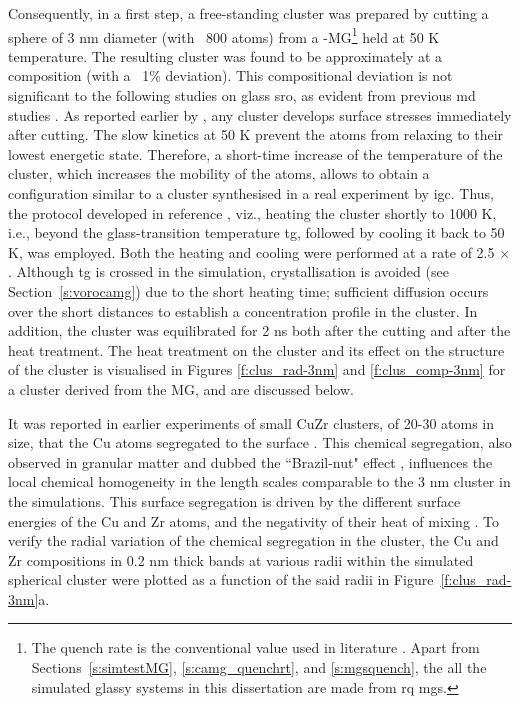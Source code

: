 \begin{changebar}
Consequently, in a first step, a free-standing cluster was prepared by cutting a sphere of 3 nm diameter (with ~800 atoms) from a  \cz-MG\footnote{The  quench rate is the conventional value used in literature \cite{Ritter2011,Adjaoud2016,Adjaoud2018}. Apart from Sections~\ref{s:simtestMG}, \ref{s:camg_quenchrt}, and \ref{s:mgsquench}, the all the simulated glassy systems in this dissertation are made from  \gls{rq} \gls{mg}s.} held at 50 K temperature. The resulting cluster was found to be approximately at a \cz composition (with a ~1\% deviation). This compositional deviation is not significant to the following studies on glass \gls{sro}, as evident from previous \gls{md} studies \cite{Peng2010}. As reported earlier by \textcite{Adjaoud2016}, any cluster develops surface stresses  immediately after cutting. The slow kinetics at 50 K prevent the atoms from relaxing to their lowest energetic state. Therefore, a short-time increase of the temperature of the cluster, which increases the mobility of the atoms, allows to obtain a configuration similar to a cluster synthesised in a real experiment by \gls{igc}. Thus, the protocol developed in reference \cite{Adjaoud2016}, viz., heating the cluster shortly to 1000 K, i.e., beyond the glass-transition temperature \gls{tg}, followed by cooling it back to 50 K, was employed. Both the heating and cooling were performed at a rate of 2.5 $\times$ . Although \gls{tg} is crossed in the simulation, crystallisation is avoided (see Section~\ref{s:vorocamg}) due to the short heating time; sufficient diffusion occurs over the short distances to establish a concentration profile in the cluster. In addition, the cluster was equilibrated for 2 \gls{ns} both after the cutting and after the heat treatment. The heat treatment on the cluster and its effect on the structure of the cluster is visualised in Figures \ref{f:clus_rad-3nm} and \ref{f:clus_comp-3nm} for a cluster derived from the  MG, and are discussed below. \par
\end{changebar}

It was reported in earlier experiments of small CuZr clusters, of 20-30 atoms in size, that the Cu atoms segregated to the surface \cite{Kartouzian2014}. This chemical segregation, also observed in granular matter and dubbed the ``Brazil-nut" effect \cite{Rosato1987}, influences the local chemical homogeneity in the length scales comparable to the 3 nm cluster in the simulations. This surface segregation is driven by the different surface energies of the Cu and Zr atoms, and the negativity of their heat of mixing \cite{Wang2016,Adjaoud2016}. To verify the radial variation of the chemical segregation in the cluster, the Cu and Zr compositions in 0.2 nm thick bands at various radii within the simulated spherical cluster were plotted as a function of the said radii in Figure~\ref{f:clus_rad-3nm}a. \par 

